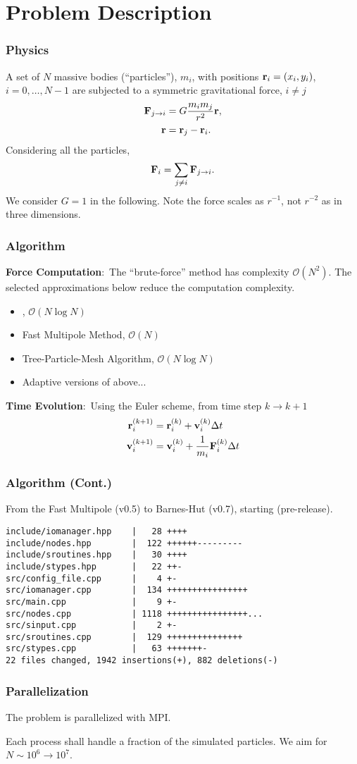 \section{Problem Description}

\begin{frame}
	\frametitle{Physics}
	A set of $N$ massive bodies (``particles''), $m_i$, with positions $\mathbf{r}_i=(x_i,y_i)$, $i=0,\ldots,N-1$ are subjected to a symmetric gravitational force, $i\neq j$
	\begin{align*}
		\mathbf{F}_{j\rightarrow i} &= G\frac{m_im_j}{r^2}\mathbf{r},\\
		\mathbf{r} &= \mathbf{r}_j-\mathbf{r}_i.
	\end{align*}
	Considering all the particles,
	\begin{align*}
		\mathbf{F}_i = \sum_{j\neq i} \mathbf{F}_{j\rightarrow i}.
	\end{align*}
	We consider $G=1$ in the following. Note the force scales as $r^{-1}$, not $r^{-2}$ as in three dimensions.
\end{frame}

\begin{frame}
\frametitle{Algorithm}
\textbf{Force Computation}:~The ``brute-force'' method has complexity $\mathcal{O}(N^2)$. The selected approximations below reduce the computation complexity.
\begin{itemize}
	\item {}, $\mathcal{O}(N\log{N})$ \parencite{Barnes1986}
	\item Fast Multipole Method, $\mathcal{O}(N)$ \parencite{Rokhlin1985}
	\item Tree-Particle-Mesh Algorithm, $\mathcal{O}(N\log{N})$ \parencite{Bagla2002}
	\item Adaptive versions of above...
\end{itemize}
\pause
\textbf{Time Evolution}:~Using the \alert{Euler scheme}, from time step $k\to k+1$
\begin{align}
	\mathbf{r}^{(k+1)}_i &= \mathbf{r}^{(k)}_i + \mathbf{v}^{(k)}_i\Delta t\\
	\mathbf{v}^{(k+1)}_i &= \mathbf{v}^{(k)}_i + \frac{1}{m_i}\mathbf{F}^{(k)}_i\Delta t
\end{align}
\end{frame}

\begin{frame}[fragile=singleslide]
	\frametitle{Algorithm (Cont.)}
	From the Fast Multipole (v0.5) to Barnes-Hut (v0.7), starting  (pre-release).
	\begin{lstlisting}
include/iomanager.hpp    |   28 ++++
include/nodes.hpp        |  122 ++++++---------
include/sroutines.hpp    |   30 ++++
include/stypes.hpp       |   22 ++-
src/config_file.cpp      |    4 +-
src/iomanager.cpp        |  134 ++++++++++++++++
src/main.cpp             |    9 +-
src/nodes.cpp            | 1118 ++++++++++++++++...
src/sinput.cpp           |    2 +-
src/sroutines.cpp        |  129 +++++++++++++++
src/stypes.cpp           |   63 +++++++-
22 files changed, 1942 insertions(+), 882 deletions(-)
	\end{lstlisting}
\end{frame}

\begin{frame}
\frametitle{Parallelization}
The problem is parallelized with MPI.

Each process shall handle a fraction of the simulated particles. We aim for $N\sim10^6\to10^7$.
\end{frame}
